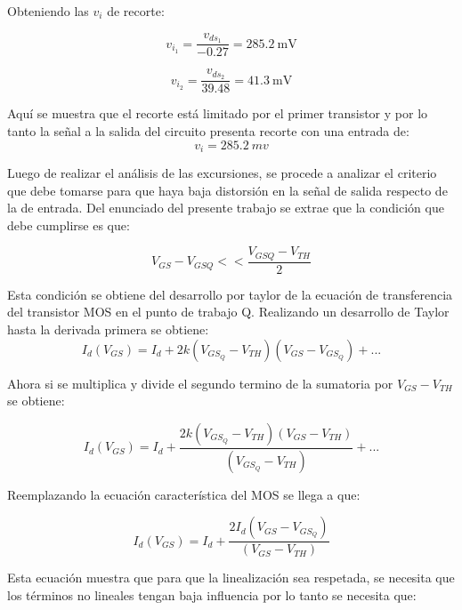 \documentclass[a4paper,10pt]{article}
\begin{document}
				Obteniendo las $v_i$ de recorte:


				\begin{displaymath}
					v_{i_1} =\frac{v_{ds_1}}{-0.27}=285.2~\text{mV}
				\end{displaymath}

				\begin{displaymath}
					v_{i_2} =\frac{v_{ds_2}}{39.48}=41.3~\text{mV}
				\end{displaymath}

				Aquí se muestra que el recorte está limitado por el primer transistor y por lo tanto la señal a la salida del circuito presenta recorte con una 
				entrada de:
				\begin{displaymath}
					v_i = 285.2~mv
				\end{displaymath}

				Luego de realizar el análisis de las excursiones, se procede a analizar el criterio que debe tomarse para que haya baja distorsión en la señal de
				salida respecto de la de entrada. Del enunciado del presente trabajo se extrae que la condición que debe cumplirse es que:

				\begin{displaymath}
					V_{GS}-V_{GSQ} << \frac{V_{GSQ}-V_{TH}}{2}
				\end{displaymath}

				Esta condición se obtiene del desarrollo por taylor de la ecuación de transferencia del transistor MOS en el punto de trabajo Q. Realizando un 
				desarrollo de Taylor hasta la derivada primera se obtiene:
				\begin{displaymath}
					I_d(V_{GS})=I_d + 2k(V_{GS_Q}-V_{TH})(V_{GS}-V_{GS_Q})+...
				\end{displaymath}

				Ahora si se multiplica y divide el segundo termino de la sumatoria por $V_{GS} - V_{TH}$ se obtiene:

				\begin{displaymath}
					I_d(V_{GS})=I_d + \frac{2k(V_{GS_Q}-V_{TH})(V_{GS}-V_{TH})}{(V_{GS_Q}-V_{TH})}+...
				\end{displaymath}

				Reemplazando la ecuaci\'{o}n caracter\'{i}stica del MOS se llega a que:

				\begin{displaymath}
					I_d(V_{GS})=I_d + \frac{2I_d(V_{GS}-V_{GS_Q})}{(V_{GS}-V_{TH})}
				\end{displaymath}

				Esta ecuación muestra que para que la linealización sea respetada, se necesita que los términos no lineales tengan baja influencia por lo tanto 
				se necesita que:
\end{document}
